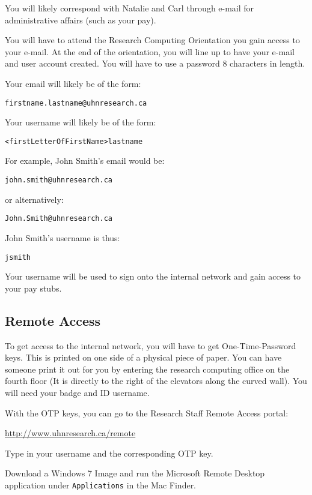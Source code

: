 \documentclass{article}
\begin{document}
You will likely correspond with Natalie and Carl through e-mail 
for administrative affairs (such as your pay).

You will have to attend the Research Computing Orientation
you gain access to your e-mail. At the end of the orientation,
you will line up to have your e-mail and user account created.
You will have to use a password 8 characters in length.

Your email will likely be of the form:
\begin{verbatim}
firstname.lastname@uhnresearch.ca
\end{verbatim}
Your username will likely be of the form:
\begin{verbatim}
<firstLetterOfFirstName>lastname
\end{verbatim}
For example, John Smith's email would be:
\begin{verbatim}
john.smith@uhnresearch.ca
\end{verbatim}
or alternatively:
\begin{verbatim}
John.Smith@uhnresearch.ca
\end{verbatim}
John Smith's username is thus:
\begin{verbatim}
jsmith
\end{verbatim}
Your username will be used to sign onto the internal network
and gain access to your pay stubs.

\subsection{Remote Access}

To get access to the internal network, you will have to get One-Time-Password
keys. This is printed on one side of a physical piece of paper.
You can have someone print it out for you by entering the research
computing office on the fourth floor (It is directly to the right of the elevators
along the curved wall). You will need your badge and ID username.

With the OTP keys, you can go to the Research Staff Remote Access portal:

\url{http://www.uhnresearch.ca/remote}

Type in your username and the corresponding OTP key.

Download a Windows 7 Image and run the Microsoft Remote Desktop
application under \texttt{Applications} in the Mac Finder. 
\end{document}
